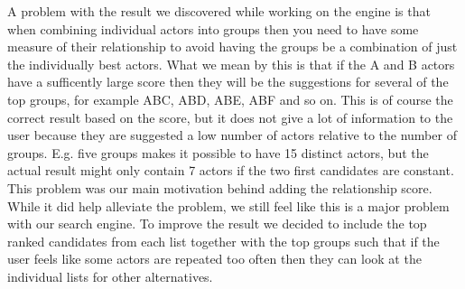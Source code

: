 A problem with the result we discovered while working on the engine is that when combining individual actors into groups then you need to have some measure of their relationship to avoid having the groups be a combination of just the individually best actors. What we mean by this is that if the A and B actors have a sufficently large score then they will be the suggestions for several of the top groups, for example ABC, ABD, ABE, ABF and so on. This is of course the correct result based on the score, but it does not give a lot of information to the user because they are suggested a low number of actors relative to the number of groups. E.g. five groups makes it possible to have 15 distinct actors, but the actual result might only contain 7 actors if the two first candidates are constant. This problem was our main motivation behind adding the relationship score. While it did help alleviate the problem, we still feel like this is a major problem with our search engine. To improve the result we decided to include the top ranked candidates from each list together with the top groups such that if the user feels like some actors are repeated too often then they can look at the individual lists for other alternatives.